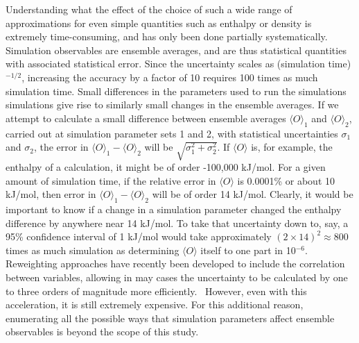 Understanding what the effect of the choice of such a wide range of
approximations for even simple quantities such as enthalpy or density
is extremely time-consuming, and has only been done partially
systematically. 
Simulation observables are ensemble averages, and are
thus statistical quantities with associated statistical error. Since
the uncertainty scales as (simulation time)$^{-1/2}$, increasing the
accuracy by a factor of 10 requires 100 times as much simulation
time. Small differences in the parameters used to run the simulations
simulations give rise to similarly small changes in the ensemble
averages. If we attempt to calculate a small difference between
ensemble averages $\langle O \rangle_1$ and $\langle O \rangle_2$,
carried out at simulation parameter sets 1 and 2, with statistical
uncertainties $\sigma_1$ and $\sigma_2$, the error in $\langle O
\rangle_1 - \langle O \rangle_2$ will be
$\sqrt{\sigma_1^2+\sigma_2^2}$. If $\langle O \rangle$ is, for
example, the enthalpy of a calculation, it might be of order -100,000
kJ/mol.  For a given amount of simulation time, if the relative error
in $\langle O \rangle$ is 0.0001\% or about 10 kJ/mol, then error in
$\langle O\rangle_1 - \langle O \rangle_2$ will be of order 14
kJ/mol. Clearly, it would be important to know if a change in a
simulation parameter changed the enthalpy difference by anywhere
near 14 kJ/mol. To take that uncertainty down to, say, a 95\%
confidence interval of 1 kJ/mol would take approximately $(2\times
14)^2 \approx 800$ times as much simulation as determining $\langle O
\rangle$ itself to one part in 10$^{-6}$.  Reweighting approaches have
recently been developed to include the correlation between variables,
allowing in may cases the uncertainty to be calculated by one to three
orders of magnitude more efficiently.~\cite{Paliwal2013} However, even
with this acceleration, it is still extremely expensive. For this
additional reason, enumerating all the possible ways that simulation
parameters affect ensemble observables is beyond the scope of this
study.

